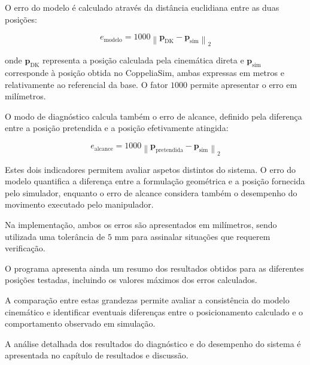 O erro do modelo é calculado através da distância euclidiana entre as duas posições:

\begin{equation}
    e_{\mathrm{modelo}} =
    1000
    \left\|
    \mathbf{p}_{\mathrm{DK}} -
    \mathbf{p}_{\mathrm{sim}}
    \right\|_2
    \label{eq:erro_modelo}
\end{equation}

onde $\mathbf{p}_{\mathrm{DK}}$ representa a posição calculada pela cinemática direta e $\mathbf{p}_{\mathrm{sim}}$ corresponde à posição obtida no CoppeliaSim, ambas expressas em metros e relativamente ao referencial da base. O fator $1000$ permite apresentar o erro em milímetros.

O modo de diagnóstico calcula também o erro de alcance, definido pela diferença entre a posição pretendida e a posição efetivamente atingida:

\begin{equation}
    e_{\mathrm{alcance}} =
    1000
    \left\|
    \mathbf{p}_{\mathrm{pretendida}} -
    \mathbf{p}_{\mathrm{sim}}
    \right\|_2
    \label{eq:erro_alcance}
\end{equation}

Estes dois indicadores permitem avaliar aspetos distintos do sistema. O erro do modelo quantifica a diferença entre a formulação geométrica e a posição fornecida pelo simulador, enquanto o erro de alcance considera também o desempenho do movimento executado pelo manipulador.

Na implementação, ambos os erros são apresentados em milímetros, sendo utilizada uma tolerância de $5$ mm para assinalar situações que requerem verificação.

O programa apresenta ainda um resumo dos resultados obtidos para as diferentes posições testadas, incluindo os valores máximos dos erros calculados.

A comparação entre estas grandezas permite avaliar a consistência do modelo cinemático e identificar eventuais diferenças entre o posicionamento calculado e o comportamento observado em simulação.

A análise detalhada dos resultados do diagnóstico e do desempenho do sistema é apresentada no capítulo de resultados e discussão.
\fi